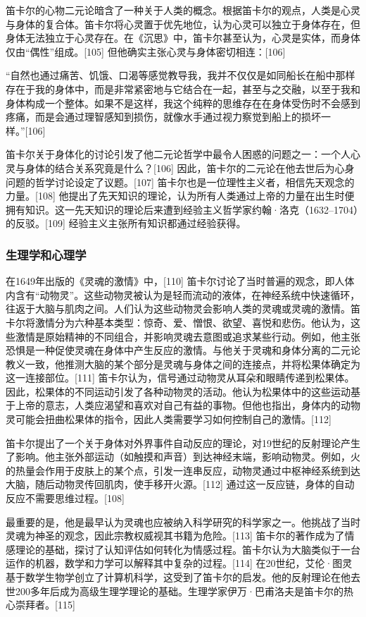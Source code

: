 笛卡尔的心物二元论暗含了一种关于人类的概念。根据笛卡尔的观点，人类是心灵与身体的复合体。笛卡尔将心灵置于优先地位，认为心灵可以独立于身体存在，但身体无法独立于心灵存在。在《沉思》中，笛卡尔甚至认为，心灵是实体，而身体仅由“偶性”组成。[105] 但他确实主张心灵与身体密切相连：[106]

“自然也通过痛苦、饥饿、口渴等感觉教导我，我并不仅仅是如同船长在船中那样存在于我的身体中，而是非常紧密地与它结合在一起，甚至与之交融，以至于我和身体构成一个整体。如果不是这样，我这个纯粹的思维存在在身体受伤时不会感到疼痛，而是会通过理智感知到损伤，就像水手通过视力察觉到船上的损坏一样。”[106]

笛卡尔关于身体化的讨论引发了他二元论哲学中最令人困惑的问题之一：一个人心灵与身体的结合关系究竟是什么？[106] 因此，笛卡尔的二元论在他去世后为心身问题的哲学讨论设定了议题。[107] 笛卡尔也是一位理性主义者，相信先天观念的力量。[108] 他提出了先天知识的理论，认为所有人类通过上帝的力量在出生时便拥有知识。这一先天知识的理论后来遭到经验主义哲学家约翰·洛克（1632–1704）的反驳。[109] 经验主义主张所有知识都通过经验获得。
\subsubsection{生理学和心理学}
在1649年出版的《灵魂的激情》中，[110] 笛卡尔讨论了当时普遍的观念，即人体内含有“动物灵”。这些动物灵被认为是轻而流动的液体，在神经系统中快速循环，往返于大脑与肌肉之间。人们认为这些动物灵会影响人类的灵魂或灵魂的激情。笛卡尔将激情分为六种基本类型：惊奇、爱、憎恨、欲望、喜悦和悲伤。他认为，这些激情是原始精神的不同组合，并影响灵魂去意图或追求某些行动。例如，他主张恐惧是一种促使灵魂在身体中产生反应的激情。与他关于灵魂和身体分离的二元论教义一致，他推测大脑的某个部分是灵魂与身体之间的连接点，并将松果体确定为这一连接部位。[111] 笛卡尔认为，信号通过动物灵从耳朵和眼睛传递到松果体。因此，松果体的不同运动引发了各种动物灵的活动。他认为松果体中的这些运动基于上帝的意志，人类应渴望和喜欢对自己有益的事物。但他也指出，身体内的动物灵可能会扭曲松果体的指令，因此人类需要学习如何控制自己的激情。[112]

笛卡尔提出了一个关于身体对外界事件自动反应的理论，对19世纪的反射理论产生了影响。他主张外部运动（如触摸和声音）到达神经末端，影响动物灵。例如，火的热量会作用于皮肤上的某个点，引发一连串反应，动物灵通过中枢神经系统到达大脑，随后动物灵传回肌肉，使手移开火源。[112] 通过这一反应链，身体的自动反应不需要思维过程。[108]

最重要的是，他是最早认为灵魂也应被纳入科学研究的科学家之一。他挑战了当时灵魂为神圣的观念，因此宗教权威视其书籍为危险。[113] 笛卡尔的著作成为了情感理论的基础，探讨了认知评估如何转化为情感过程。笛卡尔认为大脑类似于一台运作的机器，数学和力学可以解释其中复杂的过程。[114] 在20世纪，艾伦·图灵基于数学生物学创立了计算机科学，这受到了笛卡尔的启发。他的反射理论在他去世200多年后成为高级生理学理论的基础。生理学家伊万·巴甫洛夫是笛卡尔的热心崇拜者。[115]
